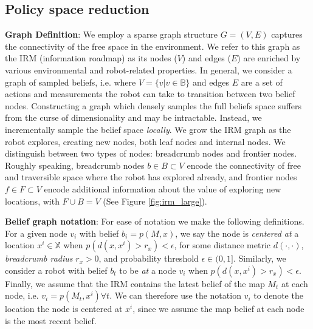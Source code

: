 \documentclass[letterpaper, 10 pt, conference]{ieeeconf}  %
\newcommand{\ph}[1]{{\textbf{#1}:}} %
\begin{document}
\subsection{Policy space reduction}


\ph{Graph Definition}
We employ a sparse graph structure $G = (V, E)$ captures the connectivity of the free space in the environment.  We refer to this graph as the IRM (information roadmap) as its nodes ($V$) and edges ($E$) are enriched by various environmental and robot-related properties.  In general, we consider a graph of sampled beliefs, i.e. where $V=\{v|v\in\mathbb{B}\}$ and edges $E$ are a set of actions and measurements the robot can take to transition between two belief nodes. Constructing a graph which densely samples the full beliefs space suffers from the curse of dimensionality and may be intractable.  Instead, we incrementally sample the belief space \textit{locally}.  We grow the IRM graph as the robot explores, creating new nodes, both leaf nodes and internal nodes.  We distinguish between two types of nodes:  breadcrumb nodes and frontier nodes.  Roughly speaking, breadcrumb nodes $b\in B \subset V$ encode the connectivity of free and traversible space where the robot has explored already, and frontier nodes $f\in F\subset V$ encode additional information about the value of exploring new locations, with $F\cup B = V$ (See Figure \ref{fig:irm_large}).

\ph{Belief graph notation}
For ease of notation we make the following definitions.  For a given node $v_i$ with belief $b_i = p(M,x)$, we say the node is \textit{centered at} a location $x^i\in\mathbb{X}$ when $p(d(x,x^i)>r_x)<\epsilon$, for some distance metric $d(\cdot,\cdot)$, \textit{breadcrumb radius} $r_x>0$, and probability threshold $\epsilon\in(0,1]$.  Similarly, we consider a robot with belief $b_t$ to be \textit{at} a node $v_i$ when $p(d(x,x^i)>r_x)<\epsilon$.  Finally, we assume that the IRM contains the latest belief of the map $M_t$ at each node, i.e. $v_i=p(M_t,x^i)\forall t$.  We can therefore use the notation $v_i$ to denote the location the node is centered at $x^i$, since we assume the map belief at each node is the most recent belief.
\end{document}
